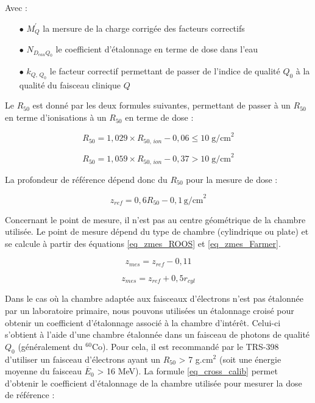 \documentclass{article}
\begin{document}
Avec :
\begin{itemize}
  \item[$\bullet$] $M_Q^{'}$ la mersure de la charge corrigée des facteurs correctifs
  \item[$\bullet$] $N_{D_{eau} Q_0}$ le coefficient d'étalonnage en terme de dose dans l'eau
  \item[$\bullet$] $k_{Q,\, Q_0}$ le facteur correctif permettant de passer de l'indice de qualité $Q_0$ à la qualité du faisceau clinique $Q$
\end{itemize}

Le $R_{50}$ est donné par les deux formules suivantes, permettant de passer à un $R_{50}$ en terme d'ionisations à un $R_{50}$ en terme de dose :

\begin{equation}
  R_{50} = 1,029 \times R_{50,\, ion} - 0,06 \leq 10\; \text{g/cm}^2
\end{equation}

\begin{equation}
  R_{50} = 1,059 \times R_{50,\, ion} - 0,37 > 10\; \text{g/cm}^2
\end{equation}

La profondeur de référence dépend donc du $R_{50}$ pour la mesure de dose :

\begin{equation}
  z_{ref} = 0,6 R_{50} - 0,1 \, \text{g/cm}^2
\end{equation}

Concernant le point de mesure, il n'est pas au centre géométrique de la chambre utilisée. Le point de mesure dépend du type de chambre (cylindrique ou plate) et se calcule à partir des équations \ref*{eq_zmes_ROOS} et \ref*{eq_zmes_Farmer}.

\begin{equation}
  z_{mes} = z_{ref} - 0,11
  \label{eq_zmes_ROOS}
\end{equation}

\begin{equation}
  z_{mes} = z_{ref} + 0,5 r_{cyl}
  \label{eq_zmes_Farmer}
\end{equation}

Dans le cas où la chambre adaptée aux faisceaux d'électrons n'est pas étalonnée par un laboratoire primaire, nous pouvons utilisées un étalonnage croisé pour obtenir un coefficient d'étalonnage associé à la chambre d'intérêt. Celui-ci s'obtient à l'aide d'une chambre étalonnée dans un faisceau de photons de qualité $Q_0$ (généralement du $^{60}$Co). Pour cela, il est recommandé par le TRS-398 d'utiliser un faisceau d'électrons ayant un $R_{50}$ > 7 g.cm$^2$ (soit une énergie moyenne du faisceau $\overline{E}_0$ > 16 MeV). La formule \ref*{eq_cross_calib} permet d'obtenir le coefficient d'étalonnage de la chambre utilisée pour mesurer la dose de référence :
\end{document}
